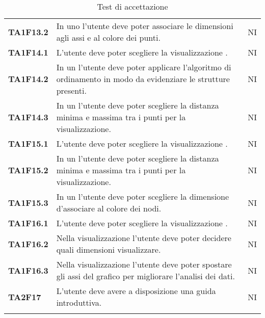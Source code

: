 {\begin{longtable}{ C{2cm} | C{12cm}| C{1.5cm} }
\textbf{TA1F13.2} & 
In uno  l'utente deve poter associare le dimensioni agli assi e al colore dei punti. & 
NI\\

\textbf{TA1F14.1} & 
L'utente deve poter scegliere la visualizzazione . & 
NI\\

\textbf{TA1F14.2} & 
In un  l'utente deve poter applicare l'algoritmo di ordinamento in modo da evidenziare le strutture presenti. & 
NI\\

\textbf{TA1F14.3} & 
In un  l'utente deve poter scegliere la distanza minima e massima tra i punti per la visualizzazione. & 
NI\\

\textbf{TA1F15.1} & 
L'utente deve poter scegliere la visualizzazione . & 
NI\\

\textbf{TA1F15.2} & 
In un  l'utente deve poter scegliere la distanza minima e massima tra i punti per la visualizzazione. & 
NI\\

\textbf{TA1F15.3} & 
In un  l'utente deve poter scegliere la dimensione d'associare al colore dei nodi. & 
NI\\

\textbf{TA1F16.1} & 
L'utente deve poter scegliere la visualizzazione . & 
NI\\

\textbf{TA1F16.2} & 
Nella visualizzazione  l'utente deve poter decidere quali dimensioni visualizzare. & 
NI\\

\textbf{TA1F16.3} & 
Nella visualizzazione  l'utente deve poter spostare gli assi del grafico per migliorare l'analisi dei dati. & 
NI\\

\textbf{TA2F17} & 
L'utente deve avere a disposizione una guida introduttiva. & 
NI\\


\caption{Test di accettazione}
\label{testSistema}
\end{longtable}

}